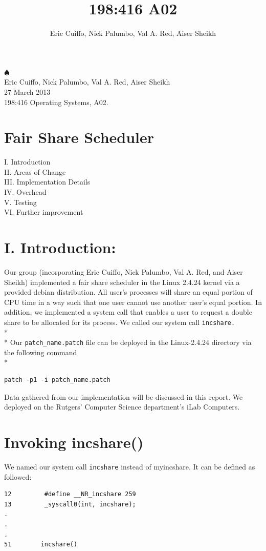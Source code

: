 \documentclass[10pt]{article}
\begin{document}
\title{198:416 A02}
\author{Eric Cuiffo, Nick Palumbo, Val A. Red, Aiser Sheikh}

\fancyhead{}
\hspace*{95pt} $\spadesuit$\\
Eric Cuiffo, Nick Palumbo, Val A. Red, Aiser Sheikh\\
27 March 2013 \\
198:416 Operating Systems, A02.
\section{Fair Share Scheduler}
I. Introduction \\
II. Areas of Change \\
III. Implementation Details \\
IV. Overhead \\
V.  Testing \\
VI. Further improvement

\section{I. Introduction:}

Our group (incorporating Eric Cuiffo, Nick Palumbo, Val A. Red, and Aiser Sheikh) implemented a fair 
share scheduler in the Linux 2.4.24 kernel via a provided debian distribution. 
All user's processes will share an equal portion of CPU time in a way such that one
user cannot use another user's equal portion. In addition, we implemented a system call
that enables a user to request a double share to be allocated for its process. We called
our system call \texttt{incshare.} \\* \\*
\hspace*{36pt} Our \texttt{patch\_name.patch} file can be deployed in the Linux-2.4.24 directory via the following command \\*
\begin{verbatim}
patch -p1 -i patch_name.patch
\end{verbatim}

Data gathered from our implementation will be discussed in this report. We deployed on the
Rutgers' Computer Science department's iLab Computers. 

\section{Invoking incshare()}
We named our system call \texttt{incshare} instead of myincshare. It can be defined as followed: 
\begin{verbatim}
12         #define __NR_incshare 259
13         _syscall0(int, incshare);
.
.
.
51        incshare()
\end{verbatim}
\end{document}
